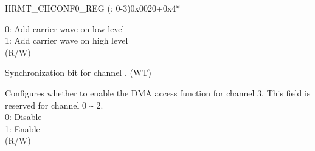 \begin{register}{H}{RMT\_CHCONF0\_REG (: 0-3)}{0x0020+0x4*}
\begin{regdesc}
\begin{reglist}
0: Add carrier wave on low level\\
1: Add carrier wave on high level\\
(R/W)
\label{fielddesc:RMTCONFUPDATECHN}\item [RMT\_CONF\_UPDATE\_CH\regindex{n}] Synchronization bit for channel . (WT)
\label{fielddesc:RMTDMAACCESSENCH3}\item [RMT\_DMA\_ACCESS\_EN\_CH3] Configures whether to enable the DMA access function for channel 3. This field is reserved for channel 0 \verb+~+ 2.\\
0: Disable\\
1: Enable\\
(R/W)
\end{reglist}\end{regdesc}
\end{register}


